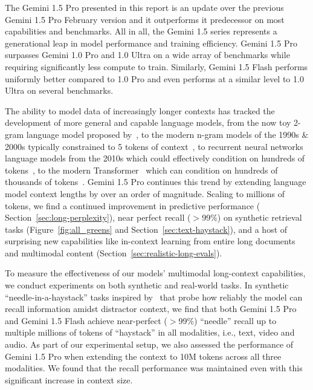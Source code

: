 The Gemini 1.5 Pro presented in this report is an update over the previous Gemini 1.5 Pro February version and it outperforms it predecessor on most capabilities and benchmarks. All in all, the Gemini 1.5 series represents a generational leap in model performance and training efficiency. Gemini 1.5 Pro surpasses Gemini 1.0 Pro and 1.0 Ultra on a wide array of benchmarks while requiring significantly less compute to train. Similarly, Gemini 1.5 Flash performs uniformly better compared to 1.0 Pro and even performs at a similar level to 1.0 Ultra on several benchmarks. 

The ability to model data of increasingly longer contexts has tracked the development of more general and capable language models, from the now toy 2-gram language model proposed by~\citet{shannon_48}, to the modern n-gram models of the 1990s \&  
2000s typically constrained to 5 tokens of context~\cite{LLM_MT, chen1999empirical, kneser_ney, jelinek1998statistical}, to recurrent neural networks language models from the 2010s which could effectively condition on hundreds of tokens~\cite{mikolov2010recurrent, jozefowicz2016exploring}, to the modern Transformer~\cite{vaswani2017} which can condition on hundreds of thousands of tokens~\cite{claude}. Gemini 1.5 Pro continues this trend by extending language model context lengths by over an order of magnitude. Scaling to millions of tokens, we find a continued improvement in predictive performance (
Section~\ref{sec:long-perplexity}), near perfect recall ($>$99\%) on synthetic retrieval tasks (Figure~\ref{fig:all_greens} and Section~\ref{sec:text-haystack}), and a host of surprising new capabilities like in-context learning from entire long documents and multimodal content (Section~\ref{sec:realistic-long-evals}).

To measure the effectiveness of our models' multimodal long-context capabilities, we conduct experiments on both synthetic and real-world tasks. In synthetic ``needle-in-a-haystack'' tasks inspired by~\citet{needle} that probe how reliably the model can recall information amidst distractor context, we find that both Gemini 1.5 Pro and Gemini 1.5 Flash achieve near-perfect ($>$99\%) ``needle'' recall up to multiple millions of tokens of ``haystack'' in all modalities, i.e., text, video and audio. As part of our experimental setup, we also assessed the performance of Gemini 1.5 Pro when extending the context to 10M tokens across all three modalities. We found that the recall performance was maintained even with this significant increase in context size.

